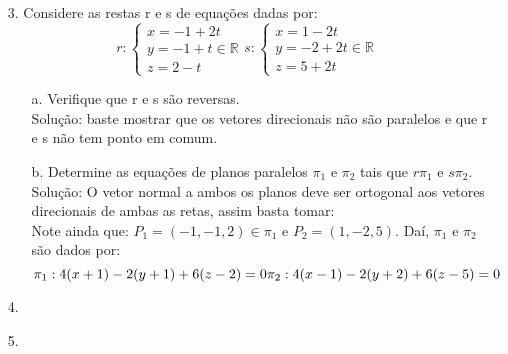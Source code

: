 \documentclass{article} %
\begin{document}
\begin{itemize}
    \item[3.] Considere as restas r e s de equações dadas por: \\
    \begin{equation}
        r:
        \begin{cases}
            x = -1 + 2t \\
            y = -1 + t  \in \mathbb{R} \\
            z = 2 - t 
        \end{cases}
        s:
        \begin{cases}
            x = 1 -2t \\
            y = -2 + 2t  \in \mathbb{R} \\
            z = 5 + 2t
        \end{cases}
    \end{equation}
    \begin{itemize}
        \item[a. ] Verifique que r e s são reversas. \\ Solução:
        baste mostrar que os vetores direcionais não são paralelos e que r e s não tem ponto em comum. 
        \item[b.] Determine as equações de planos paralelos $\pi_1$ e $\pi_2$ tais que $r \pi_1$ e $s \pi_2$.
        Solução: O vetor normal a ambos os planos deve ser ortogonal aos vetores direcionais de ambas as retas, assim basta tomar: \\
   Note ainda que: $P_1 = (-1,-1,2) \in \pi_1$ e $P_2 = (1,-2,5)$. Daí, $\pi_1$ e $\pi_2$ são dados por:
   \begin{equation}
        \pi_1 : 4(x+1) - 2(y+1) + 6(z-2) = 0 \\
        \pi_2 : 4(x-1) - 2(y+2) + 6(z-5) = 0
   \end{equation}
    \end{itemize}
    \item[4.]
    \item[5.]    
\end{itemize}
\end{document}

